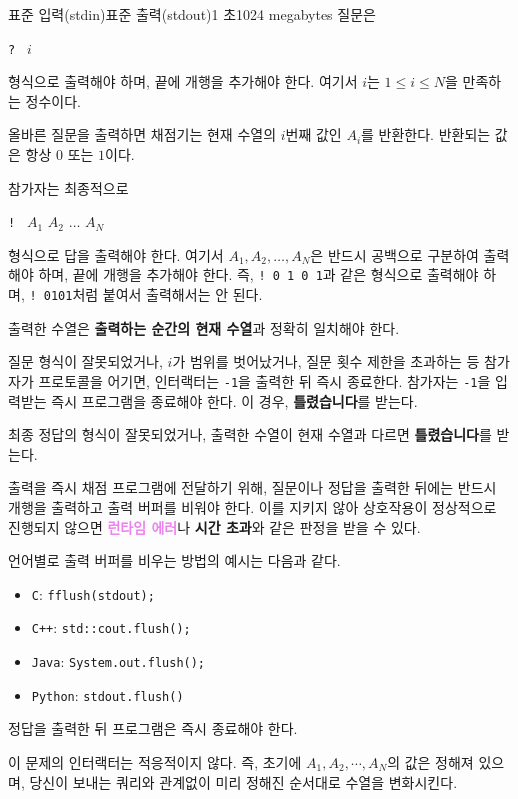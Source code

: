 \begin{problem}{\probtitle}{표준 입력(stdin)}{표준 출력(stdout)}{1 초}{1024 megabytes}
질문은
\begin{center}
\texttt{? } $i$
\end{center}
형식으로 출력해야 하며, 끝에 개행을 추가해야 한다. 여기서 $i$는 $1 \le i \le N$을 만족하는 정수이다.

올바른 질문을 출력하면 채점기는 현재 수열의 $i$번째 값인 $A_i$를 반환한다. 반환되는 값은 항상 $0$ 또는 $1$이다.

참가자는 최종적으로
\begin{center}
\texttt{! } $A_1$ $A_2$ $\dots$ $A_N$
\end{center}
형식으로 답을 출력해야 한다.
여기서 $A_1, A_2, \dots, A_N$은 반드시 공백으로 구분하여 출력해야 하며, 끝에 개행을 추가해야 한다. 
즉, \texttt{! 0 1 0 1}과 같은 형식으로 출력해야 하며, \texttt{! 0101}처럼 붙여서 출력해서는 안 된다.

출력한 수열은 \textbf{출력하는 순간의 현재 수열}과 정확히 일치해야 한다.

질문 형식이 잘못되었거나, $i$가 범위를 벗어났거나, 질문 횟수 제한을 초과하는 등 참가자가 프로토콜을 어기면, 인터랙터는 \texttt{-1}을 출력한 뒤 즉시 종료한다.
참가자는 \texttt{-1}을 입력받는 즉시 프로그램을 종료해야 한다.
이 경우, \textcolor{wared}{\textbf{틀렸습니다}}를 받는다.

최종 정답의 형식이 잘못되었거나, 출력한 수열이 현재 수열과 다르면 \textcolor{wared}{\textbf{틀렸습니다}}를 받는다.

출력을 즉시 채점 프로그램에 전달하기 위해, 질문이나 정답을 출력한 뒤에는 반드시 개행을 출력하고 출력 버퍼를 비워야 한다.
이를 지키지 않아 상호작용이 정상적으로 진행되지 않으면 \textcolor{violet}{\textbf{런타임 에러}}나 \textcolor{timeoutcolor}{\textbf{시간 초과}}와 같은 판정을 받을 수 있다.

언어별로 출력 버퍼를 비우는 방법의 예시는 다음과 같다.

\begin{itemize}[topsep=0pt,noitemsep] 
    \item \texttt{C}: \texttt{fflush(stdout);}
    \item \texttt{C++}: \texttt{std::cout.flush();}
    \item \texttt{Java}: \texttt{System.out.flush();}
    \item \texttt{Python}: \texttt{stdout.flush()}
\end{itemize}

정답을 출력한 뒤 프로그램은 즉시 종료해야 한다.

이 문제의 인터랙터는 적응적이지 않다. 즉, 초기에 $A_1, A_2, \cdots, A_N$의 값은 정해져 있으며, 당신이 보내는 쿼리와 관계없이 미리 정해진 순서대로 수열을 변화시킨다.


\end{problem}

